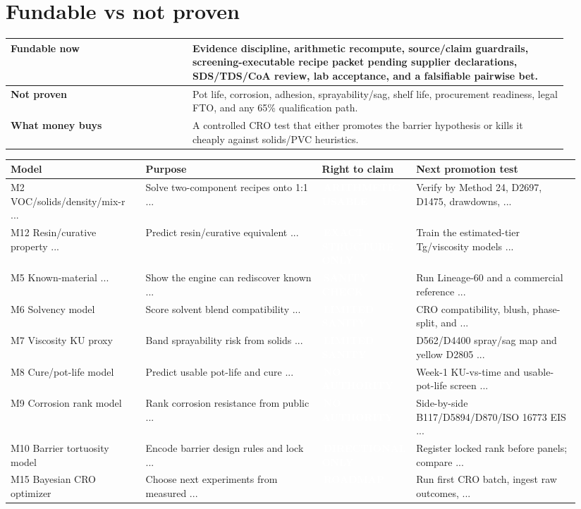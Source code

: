 \documentclass[10pt]{article}
\newcommand{\chip}[2]{\colorbox{#1}{\textcolor{white}{\scriptsize\bfseries\,#2\,}}}
\begin{document}
\section{Fundable vs not proven}
\begin{longtable}{@{}p{0.30\linewidth} p{0.62\linewidth}@{}}\toprule \textbf{Fundable now} & Evidence discipline, arithmetic recompute, source/claim guardrails, screening-executable recipe packet pending supplier declarations, SDS/TDS/CoA review, lab acceptance, and a falsifiable pairwise bet. \\ \midrule \textbf{Not proven} & Pot life, corrosion, adhesion, sprayability/sag, shelf life, procurement readiness, legal FTO, and any 65\% qualification path. \\ \midrule \textbf{What money buys} & A controlled CRO test that either promotes the barrier hypothesis or kills it cheaply against solids/PVC heuristics. \\ \bottomrule\end{longtable}
{\footnotesize\begin{longtable}{@{}>{\raggedright\arraybackslash}p{0.23\linewidth} >{\raggedright\arraybackslash}p{0.30\linewidth} p{0.13\linewidth} >{\raggedright\arraybackslash}p{0.28\linewidth}@{}}\toprule \textbf{Model} & \textbf{Purpose} & \textbf{Right to claim} & \textbf{Next promotion test} \\ \midrule M2 VOC/solids/density/mix-r ... & Solve two-component recipes onto 1:1 ... & \chip{cgreen}{ARITHMETIC USABLE} & Verify by Method 24, D2697, D1475, drawdowns, ... \\ M12 Resin/curative property ... & Predict resin/curative equivalent ... & \chip{cgreen}{EXACT STRUCTURE ONLY} & Train the estimated-tier Tg/\allowbreak{}viscosity models ... \\ M5 Known-material ... & Show the engine can rediscover known ... & \chip{camber}{SANITY CHECK} & Run Lineage-60 and a commercial reference ... \\ M6 Solvency model & Score solvent blend compatibility ... & \chip{camber}{LIMITED SANITY} & CRO compatibility, blush, phase-split, and ... \\ M7 Viscosity KU proxy & Band sprayability risk from solids ... & \chip{camber}{LIMITED SANITY} & D562/\allowbreak{}D4400 spray/\allowbreak{}sag map and yellow D2805 ... \\ M8 Cure/pot-life model & Predict usable pot-life and cure ... & \chip{cred}{NO AUTHORITY} & Week-1 KU-vs-time and usable-pot-life screen ... \\ M9 Corrosion rank model & Rank corrosion resistance from public ... & \chip{cred}{NO AUTHORITY} & Side-by-side B117/\allowbreak{}D5894/\allowbreak{}D870/\allowbreak{}ISO 16773 EIS ... \\ M10 Barrier tortuosity model & Encode barrier design rules and lock ... & \chip{camber}{DIRECTIONAL ONLY} & Register locked rank before panels; compare ... \\ M15 Bayesian CRO optimizer & Choose next experiments from measured ... & \chip{cgray}{ROADMAP} & Run first CRO batch, ingest raw outcomes, ... \\ \bottomrule\end{longtable}}
\end{document}
